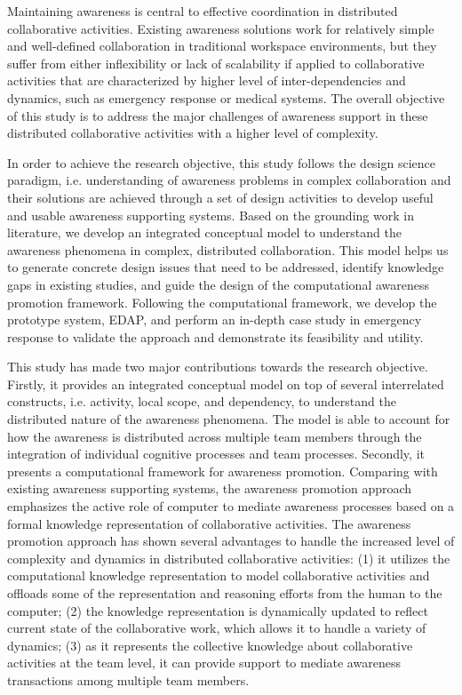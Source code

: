 Maintaining awareness is central to effective coordination in distributed collaborative activities. Existing awareness solutions work for relatively simple and well-defined collaboration in traditional workspace environments, but they suffer from either inflexibility or lack of scalability if applied to collaborative activities that are characterized by higher level of inter-dependencies and dynamics, such as emergency response or medical systems. The overall objective of this study is to address the major challenges of awareness support in these distributed collaborative activities with a higher level of complexity.

In order to achieve the research objective, this study follows the design science paradigm, i.e. understanding of awareness problems in complex collaboration and their solutions are achieved through a set of design activities to develop useful and usable awareness supporting systems. Based on the grounding work in literature, we develop an integrated conceptual model to understand the awareness phenomena in complex, distributed collaboration. This model helps us to generate concrete design issues that need to be addressed, identify knowledge gaps in existing studies, and guide the design of the computational awareness promotion framework. Following the computational framework, we develop the prototype system, EDAP, and perform an in-depth case study in emergency response to validate the approach and demonstrate its feasibility and utility.

This study has made two major contributions towards the research objective. Firstly, it provides an integrated conceptual model on top of several interrelated constructs, i.e. activity, local scope, and dependency, to understand the distributed nature of the awareness phenomena. The model is able to account for how the awareness is distributed across multiple team members through the integration of individual cognitive processes and team processes. Secondly, it presents a computational framework for awareness promotion. Comparing with existing awareness supporting systems, the awareness promotion approach emphasizes the active role of computer to mediate awareness processes based on a formal knowledge representation of collaborative activities. The awareness promotion approach has shown several advantages to handle the increased level of complexity and dynamics in distributed collaborative activities: (1) it utilizes the computational knowledge representation to model collaborative activities and offloads some of the representation and reasoning efforts from the human to the computer; (2) the knowledge representation is dynamically updated to reflect current state of the collaborative work, which allows it to handle a variety of dynamics; (3) as it represents the collective knowledge about collaborative activities at the team level, it can provide support to mediate awareness transactions among multiple team members.